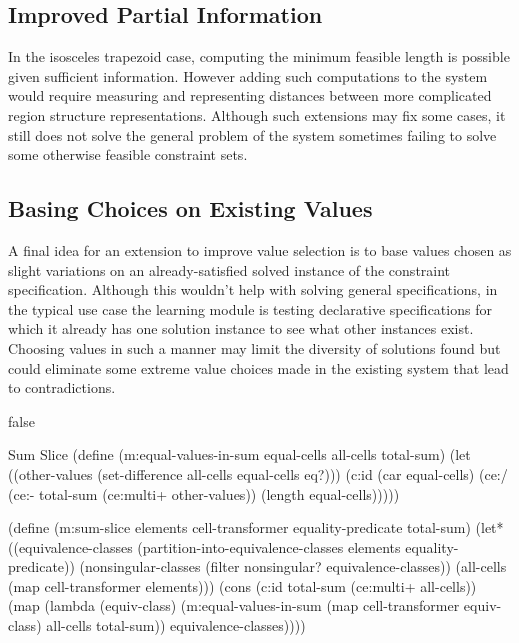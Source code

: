 \subsection{Improved Partial Information}

In the isosceles trapezoid case, computing the minimum feasible length
is possible given sufficient information. However adding such
computations to the system would require measuring and representing
distances between more complicated region structure
representations. Although such extensions may fix some cases, it still
does not solve the general problem of the system sometimes failing to
solve some otherwise feasible constraint sets.

\subsection{Basing Choices on Existing Values}

A final idea for an extension to improve value selection is to base
values chosen as slight variations on an already-satisfied solved
instance of the constraint specification. Although this wouldn't help
with solving general specifications, in the typical use case the
learning module is testing declarative specifications for which it
already has one solution instance to see what other instances
exist. Choosing values in such a manner may limit the diversity of
solutions found but could eliminate some extreme value choices made in
the existing system that lead to contradictions.


\if false
\begin{code-listing}
[label=sum-slice]
{Sum Slice}
(define (m:equal-values-in-sum equal-cells all-cells total-sum)
  (let ((other-values (set-difference all-cells equal-cells eq?)))
    (c:id (car equal-cells)
          (ce:/ (ce:- total-sum (ce:multi+ other-values))
                (length equal-cells)))))

(define (m:sum-slice elements cell-transformer equality-predicate total-sum)
  (let* ((equivalence-classes
          (partition-into-equivalence-classes elements equality-predicate))
         (nonsingular-classes (filter nonsingular? equivalence-classes))
         (all-cells (map cell-transformer elements)))
    (cons (c:id total-sum (ce:multi+ all-cells))
          (map (lambda (equiv-class)
                 (m:equal-values-in-sum
                  (map cell-transformer equiv-class) all-cells total-sum))
               equivalence-classes))))
\end{code-listing}


